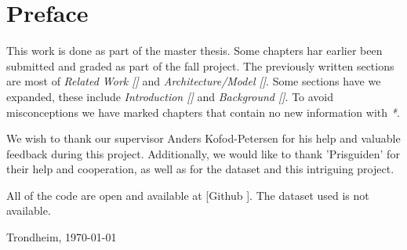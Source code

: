 \section*{Preface}



\vspace{1cm}

This work is done as part of the master thesis. Some chapters har earlier been submitted and graded
as part of the fall project. The previously written sections are most of
\textit{Related Work []} and \textit{Architecture/Model []}.
Some sections have we expanded, these include \textit{Introduction [] } and
\textit{Background []}.
To avoid misconceptions we have marked chapters that contain no new
information with \textit{*}.

We wish to thank our supervisor Anders Kofod-Petersen for his help and valuable feedback during this project.
Additionally, we would like to thank 'Prisguiden' for their help and cooperation,
as well as for the dataset and this intriguing project.

All of the code are open and available at [Github \cite{githubSource}]. The dataset used is not available.

\vfill

\hfill \thesisAuthor

\hfill Trondheim, \today